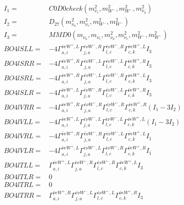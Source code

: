 \documentclass[A4,landscape]{article}
\begin{document}
\begin{align} 
I_1 = & C0D0check(m^2_{\nu_{{c}}}, m^2_{W^-}, m^2_{W^-}, m^2_{\nu_{{a}}}) \\ 
I_2 = & D_{27}(m^2_{\nu_{{a}}}, m^2_{\nu_{{c}}}, m^2_{W^-}, m^2_{W^-}) \\ 
I_3 = & MMD0(m_{\nu_{{a}}}, m_{\nu_{{c}}}, m^2_{\nu_{{a}}}, m^2_{\nu_{{c}}}, m^2_{W^-}, m^2_{W^-}) \\ 
  BO4lSLL= & -4  \Gamma^{\bar{\nu}e W^+,L}_{a, i} \Gamma^{\bar{e}\nu W^- ,R}_{j, a} \Gamma^{\bar{e}\nu W^- ,R}_{l, c} \Gamma^{\bar{\nu}e W^+,L}_{c, k} I_3 \\ 
  BO4lSRR= & -4  \Gamma^{\bar{\nu}e W^+,R}_{a, i} \Gamma^{\bar{e}\nu W^- ,L}_{j, a} \Gamma^{\bar{e}\nu W^- ,L}_{l, c} \Gamma^{\bar{\nu}e W^+,R}_{c, k} I_3 \\ 
  BO4lSRL= & -4  \Gamma^{\bar{\nu}e W^+,R}_{a, i} \Gamma^{\bar{e}\nu W^- ,L}_{j, a} \Gamma^{\bar{e}\nu W^- ,R}_{l, c} \Gamma^{\bar{\nu}e W^+,L}_{c, k} I_3 \\ 
  BO4lSLR= & -4  \Gamma^{\bar{\nu}e W^+,L}_{a, i} \Gamma^{\bar{e}\nu W^- ,R}_{j, a} \Gamma^{\bar{e}\nu W^- ,L}_{l, c} \Gamma^{\bar{\nu}e W^+,R}_{c, k} I_3 \\ 
  BO4lVRR= & -4  \Gamma^{\bar{\nu}e W^+,R}_{a, i} \Gamma^{\bar{e}\nu W^- ,R}_{j, a} \Gamma^{\bar{e}\nu W^- ,R}_{l, c} \Gamma^{\bar{\nu}e W^+,R}_{c, k} (I_1 - 3 I_2) \\ 
  BO4lVLL= & -4  \Gamma^{\bar{\nu}e W^+,L}_{a, i} \Gamma^{\bar{e}\nu W^- ,L}_{j, a} \Gamma^{\bar{e}\nu W^- ,L}_{l, c} \Gamma^{\bar{\nu}e W^+,L}_{c, k} (I_1 - 3 I_2) \\ 
  BO4lVRL= & -4  \Gamma^{\bar{\nu}e W^+,R}_{a, i} \Gamma^{\bar{e}\nu W^- ,R}_{j, a} \Gamma^{\bar{e}\nu W^- ,L}_{l, c} \Gamma^{\bar{\nu}e W^+,L}_{c, k} I_1 \\ 
  BO4lVLR= & -4  \Gamma^{\bar{\nu}e W^+,L}_{a, i} \Gamma^{\bar{e}\nu W^- ,L}_{j, a} \Gamma^{\bar{e}\nu W^- ,R}_{l, c} \Gamma^{\bar{\nu}e W^+,R}_{c, k} I_1 \\ 
  BO4lTLL= &  \Gamma^{\bar{\nu}e W^+,L}_{a, i} \Gamma^{\bar{e}\nu W^- ,R}_{j, a} \Gamma^{\bar{e}\nu W^- ,R}_{l, c} \Gamma^{\bar{\nu}e W^+,L}_{c, k} I_3 \\ 
  BO4lTLR= & 0 \\ 
  BO4lTRL= & 0 \\ 
  BO4lTRR= &  \Gamma^{\bar{\nu}e W^+,R}_{a, i} \Gamma^{\bar{e}\nu W^- ,L}_{j, a} \Gamma^{\bar{e}\nu W^- ,L}_{l, c} \Gamma^{\bar{\nu}e W^+,R}_{c, k} I_3 \\ 
\end{align} 
\end{document}
